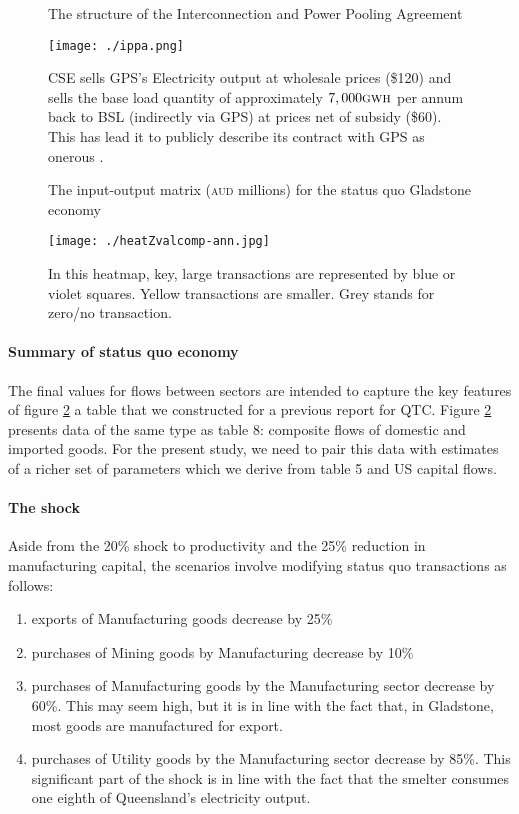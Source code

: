 \documentclass[12pt,a4paper]{article}
\begin{document}
\begin{figure}[H] \caption{  \label{fig-Bx-ratio} The structure of the
  Interconnection and Power Pooling Agreement}
  \texttt{[image: ./ippa.png]} \vskip5pt
  \caption*{\footnotesize CSE sells GPS's Electricity output at wholesale
  prices (\$120) and sells the base load quantity of approximately
  $7,000\textsc{gwh}$ per annum back to BSL (indirectly via GPS) at prices net
  of subsidy (\$60). This has lead it to publicly describe its contract with
  GPS as onerous \cite{CSE}.} \end{figure}
\begin{figure}[H]
    \caption{\label{fig-heatAcomp} The input-output matrix (\textsc{aud}
    millions) for the status quo Gladstone economy}
  \texttt{[image: ./heatZvalcomp-ann.jpg]} \caption*{
    In this heatmap, key, large transactions are represented by blue or violet
    squares. Yellow transactions are smaller. Grey stands for zero/no
    transaction.  }
\end{figure}

\paragraph{Summary of status quo economy} The final values for flows between
sectors are intended to capture the key features of figure \ref{fig-heatAcomp}
a table that we constructed for a previous report for QTC. Figure
\ref{fig-heatAcomp} presents data of the same type as table 8: composite flows
of domestic and imported goods.  For the present study, we need to pair this
data with estimates of a richer set of parameters which we derive from table 5
and US capital flows.


\paragraph{The shock}
Aside from the
{\color{red} 20\%} shock to productivity and the {\color{red}25\%} reduction in
manufacturing capital, the scenarios involve modifying status quo transactions
as follows:
\begin{enumerate}
    
  \item exports of Manufacturing goods decrease by {\color{red}25\%}
    
  \item purchases of Mining goods by Manufacturing decrease by {\color{red}
    10\%}

  \item purchases of Manufacturing goods by the Manufacturing sector decrease
    by {\color{red} 60\%}. This may seem high, but it is in line with the fact
    that, in Gladstone, most goods are manufactured for export.

  \item purchases of Utility goods by the Manufacturing sector decrease by
    {\color{red}85\%}. This significant part of the shock is in line with the
    fact that the smelter consumes one eighth of Queensland's electricity
    output.
    
\end{enumerate}
\end{document}
